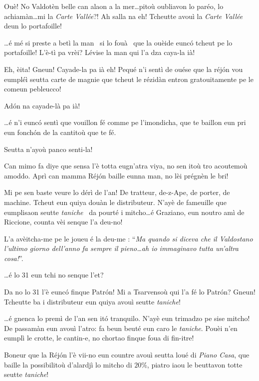 \begin{drama}
\Laurentspeaks Ouè! No Valdotèn belle can alaon a la mer\ldots pitoù oubliavon lo paréo, lo achiamàn\ldots mi la \textit{Carte Vallée}?! Ah salla na eh! Tcheutte avouì la \textit{Carte Vallée} deun lo portafoille!

\Pierrespeaks \ldots é mé si preste a betì la man \man\ si lo fouà \foua\ que  la ouèide eunc\'o tcheut pe lo portafoille! L'è-tì pa vrèi? Lévise la man qui l'a dza caya-la ià! 

\Laurentspeaks Eh, èita! Gneun! Cayade-la pa ià eh! Pequé n'i sentì de ouése que la réj\'on vou eumpléì seutta carte de magnie que tcheut le rézidàn entron gratouitamente pe le comeun pebleucco!

\Pierrespeaks Ad\'on na cayade-là pa ià!

\Laurentspeaks \ldots é n'i eunc\'o sentì que vouillon fé comme pe l'imondicha, que te baillon eun pri eun fonch\'on de la cantitoù que te fé.

\Pierrespeaks Seutta n'ayoù panco senti-la!

\Laurentspeaks Can mimo fa diye que sensa l'è totta eugn'atra viya, no sen itoù tro acoutemoù amoddo. Aprì can mamma Réj\'on baille eunna man, no lèi prégnèn le bri!

\Pierrespeaks Mi pe sen baste veure lo dérì de l'an! De tratteur, de-z-Ape, de porter, de machine. Tcheut eun quiya douàn le distributeur\distributeur . N'ayè de fameuille que eumplisaon seutte \textit{taniche} \tanica\ da pourté i mitcho\ldots é Graziano, eun noutro amì de Riccione,  counta vèi senque l'a deu-no!

\Laurentspeaks L'a avèitcha-me pe le joueu é la deu-me : ``\textit{Ma quando si diceva che il Valdostano l'ultimo giorno dell'anno fa sempre il pieno\ldots ah io immaginavo tutta un'altra cosa!}''.

\Pierrespeaks \ldots é lo 31 eun tchi no senque l'et?

\Laurentspeaks Da no lo 31 l'è eunc\'o finque Patr\'on! Mi a Tsarvensoù qui l'a fé lo Patr\'on? Gneun! Tcheutte ba i distributeur eun quiya avouì seutte \textit{taniche}!

\Pierrespeaks \ldots é gnenca lo premì de l'an sen it\'o tranquilo. N'ayè eun trimadzo pe sise mitcho! De passamàn eun avouì l'a\-tro: fa beun beuté eun caro le \textit{taniche}. Pouèi n'en eumplì le crotte, le cantin-e, no chortao finque foua di fin-itre!

\Laurentspeaks Boneur que la Réj\'on l'è vii-no eun countre avouì seutta loué di \textit{Piano Casa}, que baille la possibilitoù d'alardjì lo mitcho di $20\%$, piatro iaou le beuttavon totte seutte \textit{taniche}!


\end{drama}
